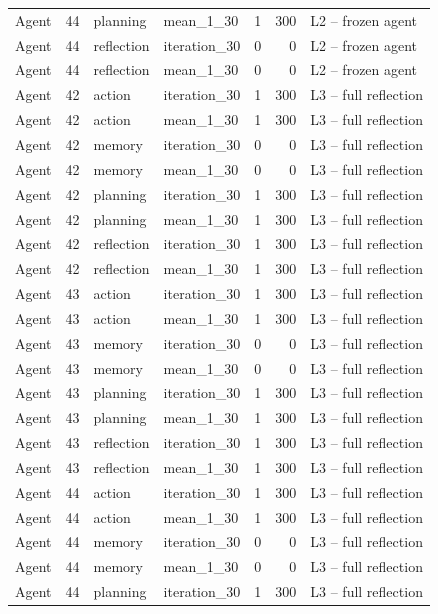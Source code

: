 \begin{table}[htbp!]
\begin{tabular}{lrllrrl}
Agent & 44 & planning & mean\_1\_30 & 1 & 300 & L2 -- frozen agent \\
Agent & 44 & reflection & iteration\_30 & 0 & 0 & L2 -- frozen agent \\
Agent & 44 & reflection & mean\_1\_30 & 0 & 0 & L2 -- frozen agent \\
Agent & 42 & action & iteration\_30 & 1 & 300 & L3 -- full reflection \\
Agent & 42 & action & mean\_1\_30 & 1 & 300 & L3 -- full reflection \\
Agent & 42 & memory & iteration\_30 & 0 & 0 & L3 -- full reflection \\
Agent & 42 & memory & mean\_1\_30 & 0 & 0 & L3 -- full reflection \\
Agent & 42 & planning & iteration\_30 & 1 & 300 & L3 -- full reflection \\
Agent & 42 & planning & mean\_1\_30 & 1 & 300 & L3 -- full reflection \\
Agent & 42 & reflection & iteration\_30 & 1 & 300 & L3 -- full reflection \\
Agent & 42 & reflection & mean\_1\_30 & 1 & 300 & L3 -- full reflection \\
Agent & 43 & action & iteration\_30 & 1 & 300 & L3 -- full reflection \\
Agent & 43 & action & mean\_1\_30 & 1 & 300 & L3 -- full reflection \\
Agent & 43 & memory & iteration\_30 & 0 & 0 & L3 -- full reflection \\
Agent & 43 & memory & mean\_1\_30 & 0 & 0 & L3 -- full reflection \\
Agent & 43 & planning & iteration\_30 & 1 & 300 & L3 -- full reflection \\
Agent & 43 & planning & mean\_1\_30 & 1 & 300 & L3 -- full reflection \\
Agent & 43 & reflection & iteration\_30 & 1 & 300 & L3 -- full reflection \\
Agent & 43 & reflection & mean\_1\_30 & 1 & 300 & L3 -- full reflection \\
Agent & 44 & action & iteration\_30 & 1 & 300 & L3 -- full reflection \\
Agent & 44 & action & mean\_1\_30 & 1 & 300 & L3 -- full reflection \\
Agent & 44 & memory & iteration\_30 & 0 & 0 & L3 -- full reflection \\
Agent & 44 & memory & mean\_1\_30 & 0 & 0 & L3 -- full reflection \\
Agent & 44 & planning & iteration\_30 & 1 & 300 & L3 -- full reflection \\

\end{tabular}
\end{table}
